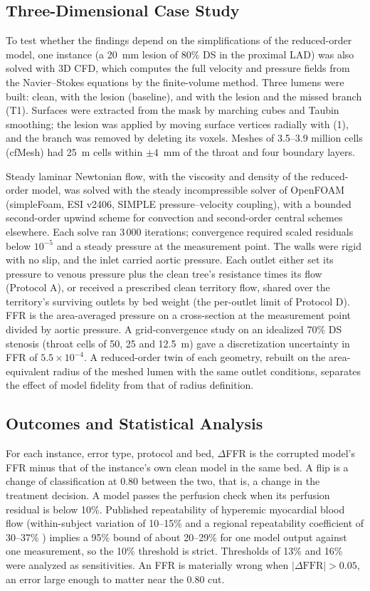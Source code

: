 \documentclass[journal]{IEEEtran}
\begin{document}
\subsection{Three-Dimensional Case Study}
To test whether the findings depend on the simplifications of the reduced-order model, one instance (a 20~mm lesion
of 80\% DS in the proximal LAD) was also solved with 3D CFD, which computes the full velocity and pressure fields
from the Navier--Stokes equations by the finite-volume method. Three lumens were built: clean, with the lesion (baseline), and with the
lesion and the missed branch (T1). Surfaces were extracted from the mask by marching cubes and Taubin smoothing; the
lesion was applied by moving surface vertices radially with (1), and the branch was removed by deleting its voxels.
Meshes of 3.5--3.9 million cells (cfMesh) had 25~\textmu m cells within $\pm 4$~mm of the throat and four boundary
layers.

Steady laminar Newtonian flow, with the viscosity and density of the reduced-order model, was solved with the
steady incompressible solver of OpenFOAM (simpleFoam, ESI v2406, SIMPLE pressure--velocity coupling), with a
bounded second-order upwind scheme for convection and second-order central schemes elsewhere. Each solve ran
3\,000 iterations; convergence required scaled residuals below $10^{-5}$ and a steady pressure at the measurement
point. The walls were rigid with no slip, and the inlet carried aortic pressure. Each outlet either set its pressure
to venous pressure plus the clean tree's resistance times its flow (Protocol A), or received a prescribed clean
territory flow, shared over the territory's surviving outlets by bed weight (the per-outlet limit of Protocol D). FFR
is the area-averaged pressure on a cross-section at the measurement point divided by aortic pressure. A
grid-convergence study on an idealized 70\% DS stenosis (throat cells of 50, 25 and 12.5~\textmu m) gave a
discretization uncertainty in FFR of $5.5\times10^{-4}$. A reduced-order twin of each geometry, rebuilt on the
area-equivalent radius of the meshed lumen with the same outlet conditions, separates the effect of model fidelity
from that of radius definition.

\subsection{Outcomes and Statistical Analysis}
For each instance, error type, protocol and bed, $\Delta$FFR is the corrupted model's FFR minus that of the
instance's own clean model in the same bed. A flip is a change of classification at 0.80 between the two, that is,
a change in the treatment decision. A model passes the perfusion check when its perfusion residual is below 10\%.
Published repeatability of hyperemic myocardial blood flow (within-subject variation of 10--15\%
\cite{schindler2023} and a regional repeatability coefficient of 30--37\% \cite{brown2018}) implies a 95\% bound of
about 20--29\% for one model output against one measurement, so the 10\% threshold is strict. Thresholds of 13\% and 16\% were analyzed as
sensitivities. An FFR is materially wrong when $|\Delta\mathrm{FFR}| > 0.05$, an error large enough to matter near
the 0.80 cut.
\end{document}
